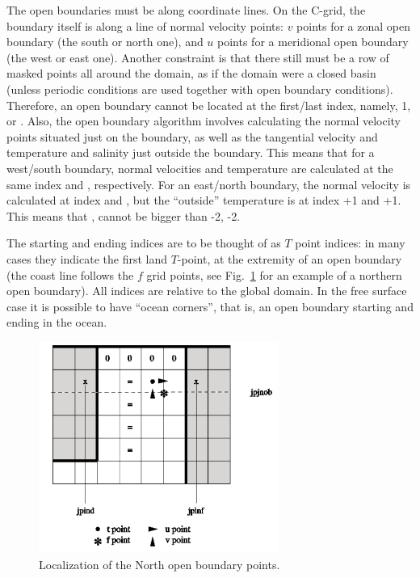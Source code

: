The open boundaries must be along coordinate lines. On the C-grid, the boundary 
itself is along a line of normal velocity points: $v$ points for a zonal open boundary 
(the south or north one), and $u$ points for a meridional open boundary (the west 
or east one). Another constraint is that there still must be a row of masked points 
all around the domain, as if the domain were a closed basin (unless periodic conditions 
are used together with open boundary conditions). Therefore, an open boundary 
cannot be located at the first/last index, namely, 1,  or . Also, 
the open boundary algorithm involves calculating the normal velocity points situated 
just on the boundary, as well as the tangential velocity and temperature and salinity 
just outside the boundary. This means that for a west/south boundary, normal 
velocities and temperature are calculated at the same index  and 
, respectively. For an east/north boundary, the normal velocity is 
calculated at index  and , but the ``outside'' temperature is 
at index +1 and +1. This means that ,  
cannot be bigger than -2, -2. 


The starting and ending indices are to be thought of as $T$ point indices: in many 
cases they indicate the first land $T$-point, at the extremity of an open boundary 
(the coast line follows the $f$ grid points, see Fig.~\ref{Fig_obc_north} for an example 
of a northern open boundary). All indices are relative to the global domain. In the 
free surface case it is possible to have ``ocean corners'', that is, an open boundary 
starting and ending in the ocean.

\begin{figure}[!t]     \begin{center}
\includegraphics[width=0.70\textwidth]{./TexFiles/Figures/Fig_obc_north.pdf}
\caption{    \label{Fig_obc_north}
Localization of the North open boundary points.}
\end{center}     \end{figure}

